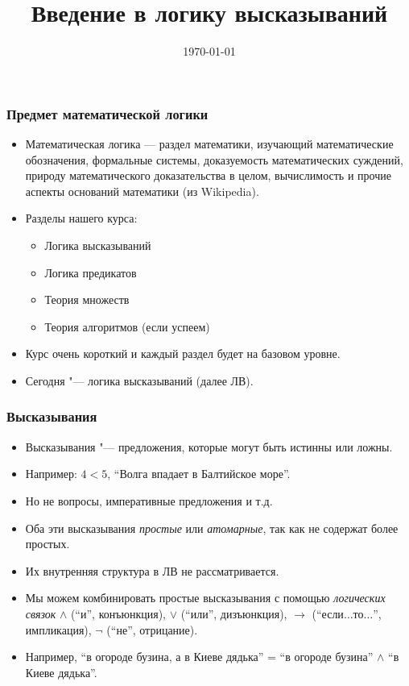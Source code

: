 \documentclass[10pt]{beamer}
\title{Введение в логику высказываний}
\date{\today}
\begin{document}
\begin{frame}[plain]
\maketitle
\end{frame}

\begin{frame}
\frametitle{Предмет математической логики}
\begin{itemize}
    \item Математическая логика — раздел математики, изучающий математические обозначения, формальные системы, доказуемость математических суждений, природу математического доказательства в целом, вычислимость и прочие аспекты оснований математики (из Wikipedia).
    \item Разделы нашего курса:
    \begin{itemize}
        \item Логика высказываний
        \item Логика предикатов
        \item Теория множеств
        \item Теория алгоритмов (если успеем)
    \end{itemize}
    \item Курс очень короткий и каждый раздел будет на базовом уровне.
    \pause
    \item Сегодня "--- логика высказываний (далее ЛВ). 
\end{itemize}
\end{frame}

\begin{frame}
    \frametitle{Высказывания}
    \begin{itemize}
        \item Высказывания "--- предложения, которые могут быть истинны или ложны.
        \item Например: $4<5$, \enquote{Волга впадает в Балтийское море}.
        \item Но не вопросы, императивные предложения и т.д.
        \pause
        \item Оба эти высказывания \emph{простые} или \emph{атомарные}, так как не содержат более простых.
        \item Их внутренняя структура в ЛВ не рассматривается.
        \pause
        \item Мы можем комбинировать простые высказывания с помощью \emph{логических связок} $\land$ (\enquote{и}, конъюнкция), $\lor$ (\enquote{или}, дизъюнкция), $\to$ (\enquote{если$\ldots$то$\ldots$}, импликация), $\neg$ (\enquote{не}, отрицание).
        \pause
        \item Например, \enquote{в огороде бузина, а в Киеве дядька} = \enquote{в огороде бузина} $\land$ \enquote{в Киеве дядька}.
    \end{itemize}
\end{frame}
\end{document}
